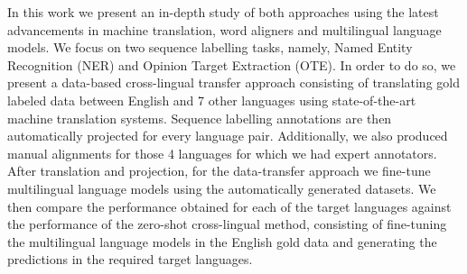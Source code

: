 \documentclass[11pt]{article}
\begin{document}
In this work we present an in-depth study of both approaches using the latest advancements in machine translation, word aligners and multilingual language models. We focus on two sequence labelling tasks, namely, Named Entity Recognition (NER) and Opinion Target Extraction (OTE). In order to do so, we present a data-based cross-lingual transfer approach consisting of translating gold labeled data between English and 7 other languages using state-of-the-art machine translation systems. Sequence labelling annotations are then automatically projected for every language pair. Additionally, we also produced manual alignments for those 4 languages for which we had expert annotators.
After translation and projection, for the data-transfer approach we fine-tune multilingual language models using the automatically generated datasets. We then compare the performance obtained for each of the target languages against the performance of the zero-shot cross-lingual method, consisting of fine-tuning the multilingual language models in the English gold data and generating the predictions in the required target languages.
\end{document}

